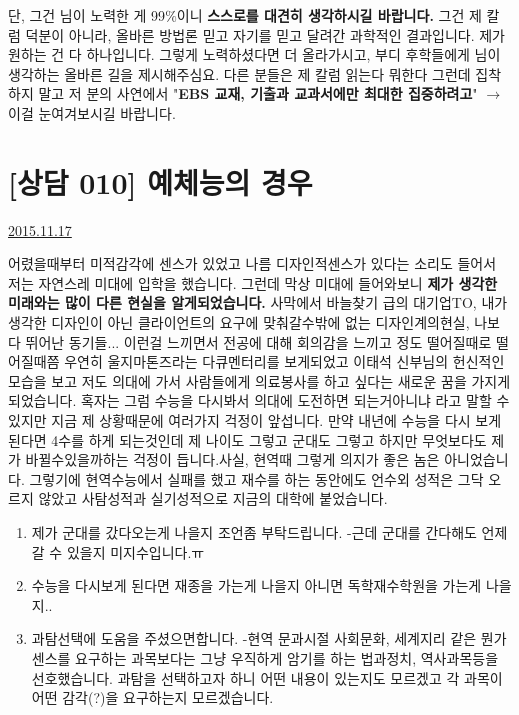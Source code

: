 단, 그건 님이 노력한 게 99$\%$이니 \textbf{스스로를 대견히 생각하시길 바랍니다.}
그건 제 칼럼 덕분이 아니라, 올바른 방법론 믿고 자기를 믿고 달려간 과학적인 결과입니다.
제가 원하는 건 다 하나입니다. 그렇게 노력하셨다면 더 올라가시고, 부디 후학들에게 님이 생각하는 올바른 길을 제시해주심요.
다른 분들은 제 칼럼 읽는다 뭐한다 그런데 집착하지 말고  저 분의 사연에서 "\textbf{EBS 교재, 기출과 교과서에만 최대한 집중하려고}" $\rightarrow$ 이걸 눈여겨보시길 바랍니다.





\section{[상담 010] 예체능의 경우}
\href{https://www.kockoc.com/Apoc/496692}{2015.11.17}


    \vspace{5mm}

    어렸을때부터 미적감각에 센스가 있었고 나름 디자인적센스가 있다는 소리도 들어서 저는 자연스레 미대에 입학을 했습니다.
    그런데 막상 미대에 들어와보니 \textbf{제가 생각한 미래와는 많이 다른 현실을 알게되었습니다.}
    사막에서 바늘찾기 급의 대기업TO, 내가 생각한 디자인이 아닌 클라이언트의 요구에 맞춰갈수밖에 없는 디자인계의현실, 나보다 뛰어난 동기들...
    이런걸 느끼면서 전공에 대해 회의감을 느끼고 정도 떨어질때로 떨어질때쯤 우연히 울지마톤즈라는 다큐멘터리를 보게되었고 이태석 신부님의 헌신적인 모습을 보고 저도 의대에 가서 사람들에게 의료봉사를 하고 싶다는 새로운 꿈을 가지게 되었습니다. 혹자는 그럼 수능을 다시봐서 의대에 도전하면 되는거아니냐 라고 말할 수 있지만 지금 제 상황때문에 여러가지 걱정이 앞섭니다.
    만약 내년에 수능을 다시 보게 된다면 4수를 하게 되는것인데 제 나이도 그렇고 군대도 그렇고 하지만 무엇보다도 제가 바뀔수있을까하는 걱정이 듭니다.사실, 현역때 그렇게 의지가 좋은 놈은 아니었습니다. 그렇기에 현역수능에서 실패를 했고 재수를 하는 동안에도 언수외 성적은 그닥 오르지 않았고 사탐성적과 실기성적으로 지금의 대학에 붙었습니다.
    \vspace{5mm}

    \begin{enumerate}
        \item  제가 군대를 갔다오는게 나을지 조언좀 부탁드립니다.
        -근데 군대를 간다해도 언제갈 수 있을지 미지수입니다.ㅠ
        
        \item 수능을 다시보게 된다면 재종을 가는게 나을지 아니면 독학재수학원을 가는게 나을지..
        \vspace{5mm}
        
        \item 과탐선택에 도움을 주셨으면합니다.
        -현역 문과시절 사회문화, 세계지리 같은 뭔가 센스를 요구하는 과목보다는 그냥 우직하게 암기를 하는 법과정치, 역사과목등을 선호했습니다. 과탐을 선택하고자 하니 어떤 내용이 있는지도 모르겠고 각 과목이 어떤 감각(?)을 요구하는지 모르겠습니다.
    \end{enumerate}


